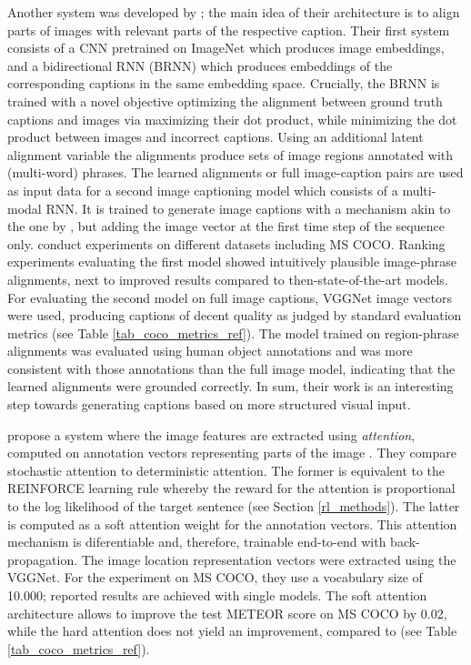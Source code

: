 Another system was developed by \cite{karpathy2015deep}; the main idea of their architecture is to align parts of images with relevant parts of the respective caption. 
Their first system consists of a CNN pretrained on ImageNet which produces image embeddings, and a bidirectional RNN (BRNN) which produces embeddings of the corresponding captions in the same embedding space. Crucially, the BRNN is trained with a novel objective optimizing the alignment between ground truth captions and images via maximizing their dot product, while minimizing the dot product between images and incorrect captions. Using an additional  latent alignment variable the alignments produce sets of image regions annotated with (multi-word) phrases.
The learned alignments or full image-caption pairs are used as input data for a second image captioning model which consists of a multi-modal RNN. It is trained to generate image captions with a mechanism akin to the one by \cite{vinyals2015show}, but adding the image vector at the first time step of the sequence only. \cite{karpathy2015deep} conduct experiments on different datasets including MS COCO. Ranking experiments evaluating the first model showed intuitively plausible image-phrase alignments, next to improved results compared to then-state-of-the-art models. 
For evaluating the second model on full image captions, VGGNet image vectors were used, producing captions of decent quality as judged by standard evaluation metrics (see Table \ref{tab_coco_metrics_ref}). The model trained on region-phrase alignments was evaluated using human object annotations and was more consistent with those annotations than the full image model, indicating that the learned alignments were grounded correctly. In sum, their work is an interesting step towards generating captions based on more structured visual input.

\cite{xu2015show} propose a system where the image features are extracted using \textit{attention}, computed on annotation vectors representing parts of the image \parencite{bahdanau2014neural}. They compare stochastic attention to deterministic attention. The former is equivalent to the REINFORCE learning rule whereby the reward for the attention is proportional to the log likelihood of the target sentence (see Section \ref{rl_methods}). The latter is computed as a soft attention weight for the annotation vectors. This attention mechanism is diferentiable and, therefore, trainable end-to-end with back-propagation. The image location representation vectors were extracted using the VGGNet. For the experiment on MS COCO, they use a vocabulary size of 10.000; reported results are achieved with single models. The soft attention architecture allows to improve the test METEOR score on MS COCO by 0.02, while the hard attention does not yield an improvement, compared to \cite{vinyals2015show} (see Table \ref{tab_coco_metrics_ref}).

